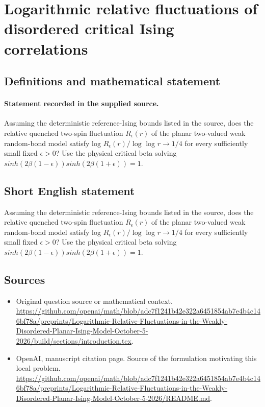 \documentclass[11pt]{article}
\begin{document}
\section*{Logarithmic relative fluctuations of disordered critical Ising correlations}\label{statement}
\subsection{Definitions and mathematical statement}
\paragraph{Statement recorded in the supplied source.}
Assuming the deterministic reference-Ising bounds listed in the source, does the relative quenched two-spin fluctuation $R_\epsilon (r)$ of the planar two-valued weak random-bond model satisfy log $R_\epsilon (r)/\log $ log $r\to 1/4$ for every sufficiently small fixed $\epsilon >0$? Use the physical critical beta solving $sinh(2\beta (1-\epsilon ))sinh(2\beta (1+\epsilon ))=1$.
\subsection{Short English statement}
Assuming the deterministic reference-Ising bounds listed in the source, does the relative quenched two-spin fluctuation $R_\epsilon (r)$ of the planar two-valued weak random-bond model satisfy log $R_\epsilon (r)/\log $ log $r\to 1/4$ for every sufficiently small fixed $\epsilon >0$? Use the physical critical beta solving $sinh(2\beta (1-\epsilon ))sinh(2\beta (1+\epsilon ))=1$.
\subsection{Sources}
\begin{itemize}
\item[S1] Original question source or mathematical context.
\url{https://github.com/openai/math/blob/adc7f1241b42e322a6451854ab7e4b4c146bf78a/preprints/Logarithmic-Relative-Fluctuations-in-the-Weakly-Disordered-Planar-Ising-Model-October-5-2026/build/sections/introduction.tex}.
\item[S2] OpenAI, manuscript citation page. Source of the formulation motivating this local problem.
\url{https://github.com/openai/math/blob/adc7f1241b42e322a6451854ab7e4b4c146bf78a/preprints/Logarithmic-Relative-Fluctuations-in-the-Weakly-Disordered-Planar-Ising-Model-October-5-2026/README.md}.
\end{itemize}
\end{document}
